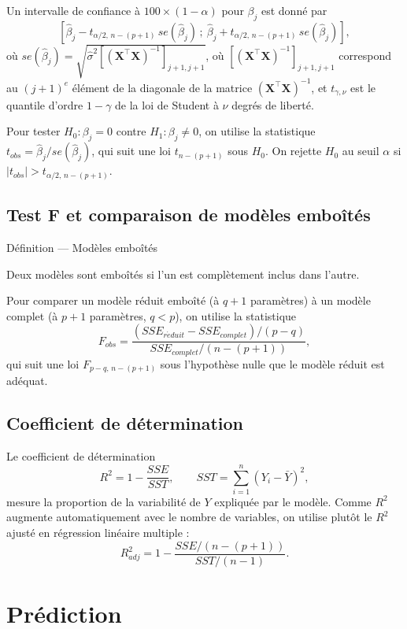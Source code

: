 \documentclass[
  french,
  letterpaper,
  DIV=11,
  numbers=noendperiod]{scrreprt}
\begin{document}
Un intervalle de confiance à \(100\times(1-\alpha)%
\) pour \(\beta_j\) est donné par
\[\left[\hat\beta_j - t_{\alpha/2,\,n-(p+1)}\, se(\hat\beta_j)\,;\ \hat\beta_j + t_{\alpha/2,\,n-(p+1)}\, se(\hat\beta_j)\right],\]
où
\(se(\hat\beta_j) = \sqrt{\hat\sigma^2 \left[(\boldsymbol{X^\top X})^{-1}\right]_{j+1,j+1}}\),
où \(\left[(\boldsymbol{X^\top X})^{-1}\right]_{j+1,j+1}\) correspond au
\((j+1)^e\) élément de la diagonale de la matrice
\((\boldsymbol{X^\top X})^{-1}\), et \(t_{\gamma,\nu}\) est le quantile
d'ordre \(1-\gamma\) de la loi de Student à \(\nu\) degrés de liberté.

Pour tester \(H_0: \beta_j = 0\) contre \(H_1 : \beta_j \neq 0\), on
utilise la statistique \(t_{obs} = \hat\beta_j / se(\hat\beta_j)\), qui
suit une loi \(t_{n-(p+1)}\) sous \(H_0\). On rejette \(H_0\) au seuil
\(\alpha\) si \(|t_{obs}| > t_{\alpha/2,\,n-(p+1)}\).

\subsection{Test F et comparaison de modèles
emboîtés}\label{test-f-et-comparaison-de-moduxe8les-embouxeetuxe9s}

{Définition --- Modèles emboîtés}

Deux modèles sont emboîtés si l'un est complètement inclus dans l'autre.

Pour comparer un modèle réduit emboîté (à \(q+1\) paramètres) à un
modèle complet (à \(p+1\) paramètres, \(q < p\)), on utilise la
statistique
\[F_{obs} = \frac{(SSE_{r\acute{e}duit} - SSE_{complet})/(p-q)}{SSE_{complet}/(n-(p+1))},\]
qui suit une loi \(F_{p-q,\, n-(p+1)}\) sous l'hypothèse nulle que le
modèle réduit est adéquat.

\subsection{Coefficient de
détermination}\label{coefficient-de-duxe9termination}

Le coefficient de détermination
\[R^2 = 1 - \frac{SSE}{SST}, \qquad SST = \sum_{i=1}^n (Y_i - \bar Y)^2,\]
mesure la proportion de la variabilité de \(Y\) expliquée par le modèle.
Comme \(R^2\) augmente automatiquement avec le nombre de variables, on
utilise plutôt le \(R^2\) ajusté en régression linéaire multiple :
\[R^2_{adj} = 1 - \frac{SSE/(n-(p+1))}{SST/(n-1)}.\]

\section{Prédiction}\label{pruxe9diction}
\end{document}
